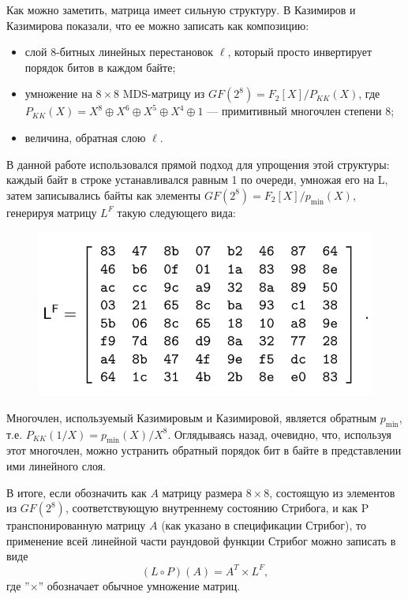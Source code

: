 Как можно заметить, матрица имеет сильную структуру. В \cite{KK13} Казимиров и Казимирова показали, что ее можно записать как композицию:
\begin{itemize}
    \item слой 8-битных линейных перестановок \(\ell\), который просто инвертирует порядок битов в каждом байте;
    \item умножение на $8 \times 8$ MDS-матрицу из $GF(2^8) = F_2[X]/P_{KK}(X)$, где \(P_{KK}(X) = X^8 \oplus X^6 \oplus X^5 \oplus X^4 \oplus 1\) — примитивный многочлен степени 8;
    \item величина, обратная слою \(\ell\).
\end{itemize}

В данной работе использовался прямой подход для упрощения этой структуры: каждый байт в строке устанавливался равным 1 по очереди, умножая его на L, затем записывались байты как элементы $GF(2^8) = F_2[X]/p_{\text{min}}(X)$, генерируя матрицу $L^F$ такую следующего вида:
\begin{figure}
  \centering
  \includegraphics[scale=0.9]{contents/pics/LF_matrix.png}
\end{figure}

Многочлен, используемый Казимировым и Казимировой, является обратным \(p_{\text{min}}\), т.е. \(P_{KK}(1/X) = p_{\text{min}}(X)/X^8\). Оглядываясь назад, очевидно, что, используя этот многочлен, можно устранить обратный порядок бит в байте в представлении ими линейного слоя.

В итоге, если обозначить как $A$ матрицу размера $8 \times 8$, состоящую из элементов из $GF(2^8)$, соответствующую внутреннему состоянию Стрибога, и как P транспонированную матрицу $A$ (как указано в спецификации Стрибог), то применение всей линейной части раундовой функции Стрибог можно записать в виде
\[
(L \circ P)(A) = A^T \times L^F,
\]
где ''$\times$'' обозначает обычное умножение матриц.

